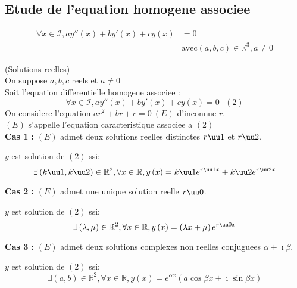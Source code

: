 \documentclass[12pt,twoside,a4paper]{article}
\begin{document}
		\subsection{Etude de l'equation homogene associee}
			$$\begin{aligned}
				\forall x\in\mathcal{I},ay''\left(x\right)+by'\left(x\right)+cy\left(x\right)&=0\\
																								&\text{avec}\left(a,b,c\right)\in\mathbb{K}^3,a\neq0
			\end{aligned}$$
			\begin{prop}
				(Solutions reelles)\\
				On suppose $a,b,c$ reels et $a\neq0$\\
				Soit l'equation differentielle homogene associee :
				$$
					\forall x\in\mathcal{I},ay''\left(x\right)+by'\left(x\right)+cy\left(x\right)=0 \ \ \ \left(2\right)
				$$
				On considere l'equation $ar^2+br+c=0 \ \left(E\right)$ d'inconnue $r$.\\
				$\left(E\right)$ s'appelle l'equation caracteristique associee a $\left(2\right)$\\
				\textbf{Cas 1 :} $\left(E\right)$ admet deux solutions reelles distinctes $r\uu1$ et $r\uu2$.
				\begin{tab}
					$y$ est solution de $\left(2\right)$ ssi:
					$$
						\exists\left(k\uu1,k\uu2\right)\in\mathbb{R}^2,\forall x\in\mathbb{R},y\left(x\right)=k\uu1e^{r\uu1x}+k\uu2e^{r\uu2x}
					$$
				\end{tab}
				\textbf{Cas 2 :} $\left(E\right)$ admet une unique solution reelle $r\uu0$.
				\begin{tab}
					$y$ est solution de $\left(2\right)$ ssi:
					$$
						\exists\left(\lambda,\mu\right)\in\mathbb{R}^2,\forall x\in\mathbb{R},y\left(x\right)=\left(\lambda x+\mu\right)e^{r\uu0x}					$$
				\end{tab}
				\textbf{Cas 3 :} $\left(E\right)$ admet deux solutions complexes non reelles conjuguees $\alpha\pm\imath\beta$.
				\begin{tab}
					$y$ est solution de $\left(2\right)$ ssi:
					$$
						\exists\left(a,b\right)\in\mathbb{R}^2,\forall x\in\mathbb{R},y\left(x\right)=e^{\alpha x}\left(a\cos\beta x+\imath\sin\beta x\right)
					$$
				\end{tab}
			\end{prop}
\end{document}
